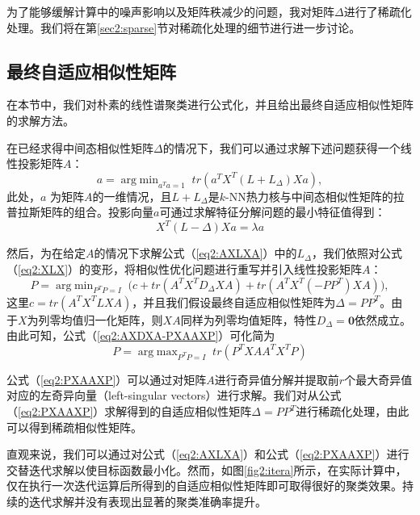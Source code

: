 为了能够缓解计算中的噪声影响以及矩阵秩减少的问题，我对矩阵$\Delta$进行了稀疏化处理。我们将在第\ref{sec2:sparse}节对稀疏化处理的细节进行进一步讨论。

\subsection{最终自适应相似性矩阵}
在本节中，我们对朴素的线性谱聚类进行公式化，并且给出最终自适应相似性矩阵的求解方法。

在已经求得中间态相似性矩阵$\Delta$的情况下，我们可以通过求解下述问题获得一个线性投影矩阵$A$：
\begin{equation}
	a = \mathop{\mathrm{arg\;min}}_{a^Ta=1}\; tr(a^TX^T(L+L_\Delta)Xa),
	\label{eq2:AXLXA}
\end{equation}
此处，$a$ 为矩阵$A$的一维情况，且$L+L_\Delta$是$k$-NN热力核与中间态相似性矩阵的拉普拉斯矩阵的组合。投影向量$a$可通过求解特征分解问题的最小特征值得到：
\begin{equation}
	X^T(L-\Delta)Xa = \lambda a
\end{equation}

然后，为在给定$A$的情况下求解公式（\ref{eq2:AXLXA}）中的$L_\Delta$，我们依照对公式（\ref{eq2:XLX}）的变形，将相似性优化问题进行重写并引入线性投影矩阵$A$：
\begin{equation}
		P = \mathop{\mathrm{arg\;min}}_{P^TP=I}\; \Big( c+tr(A^TX^TD_\Delta XA) 
		+tr(A^TX^T(-PP^T)XA)\Big),
	\label{eq2:AXDXA-PXAAXP}
\end{equation}
这里$c=tr(A^TX^TLXA)$，并且我们假设最终自适应相似性矩阵为$\Delta = PP^T$。由于$X$为列零均值归一化矩阵，则$XA$同样为列零均值矩阵，特性$D_\Delta = \textbf{0}$依然成立。由此可知，公式（\ref{eq2:AXDXA-PXAAXP}）可化简为
\begin{equation}
	P = \mathop{\mathrm{arg\;max}}_{P^TP=I}\; tr(P^TXAA^TX^TP)
	\label{eq2:PXAAXP}
\end{equation}

公式（\ref{eq2:PXAAXP}）可以通过对矩阵$A$进行奇异值分解并提取前$r$个最大奇异值对应的左奇异向量（left-singular vectors）进行求解。我们对从公式（\ref{eq2:PXAAXP}）求解得到的自适应相似性矩阵$\Delta=PP^T$进行稀疏化处理，由此可以得到稀疏相似性矩阵。

直观来说，我们可以通过对公式（\ref{eq2:AXLXA}）和公式（\ref{eq2:PXAAXP}）进行交替迭代求解以使目标函数最小化。然而，如图\ref{fig2:itera}所示，在实际计算中，仅在执行一次迭代运算后所得到的自适应相似性矩阵即可取得很好的聚类效果。持续的迭代求解并没有表现出显著的聚类准确率提升。

